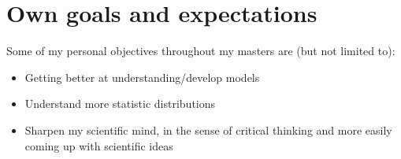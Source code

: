 \documentclass[12pt]{article}
\begin{document}
\section{Own goals and expectations}
Some of my personal objectives throughout my masters are (but not limited to):
\begin{itemize}
    \item Getting better at understanding/develop models
    \item Understand more statistic distributions
    \item Sharpen my scientific mind, in the sense of critical thinking and more easily coming up with scientific ideas
\end{itemize}

\pagebreak


\end{document}
